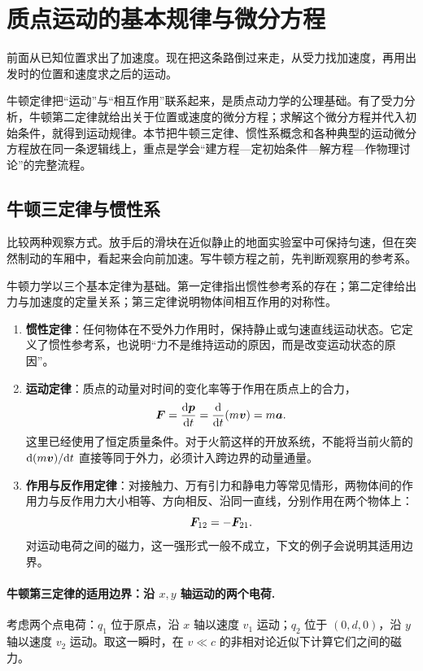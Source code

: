 \section{质点运动的基本规律与微分方程}

前面从已知位置求出了加速度。现在把这条路倒过来走，从受力找加速度，再用出发时的位置和速度求之后的运动。

牛顿定律把“运动”与“相互作用”联系起来，是质点动力学的公理基础。有了受力分析，牛顿第二定律就给出关于位置或速度的微分方程；求解这个微分方程并代入初始条件，就得到运动规律。本节把牛顿三定律、惯性系概念和各种典型的运动微分方程放在同一条逻辑线上，重点是学会“建方程—定初始条件—解方程—作物理讨论”的完整流程。

\subsection{牛顿三定律与惯性系}

比较两种观察方式。放手后的滑块在近似静止的地面实验室中可保持匀速，但在突然制动的车厢中，看起来会向前加速。写牛顿方程之前，先判断观察用的参考系。

牛顿力学以三个基本定律为基础。第一定律指出惯性参考系的存在；第二定律给出力与加速度的定量关系；第三定律说明物体间相互作用的对称性。

\begin{enumerate}[label=(\arabic*),leftmargin=2.2em]
  \item \textbf{惯性定律}：任何物体在不受外力作用时，保持静止或匀速直线运动状态。它定义了惯性参考系，也说明“力不是维持运动的原因，而是改变运动状态的原因”。
  \item \textbf{运动定律}：质点的动量对时间的变化率等于作用在质点上的合力，
  \begin{equation}
  \boldsymbol{F}=\frac{\mathrm{d} \boldsymbol{p}}{\mathrm{d} t}=\frac{\mathrm{d} }{\mathrm{d} t}(m\boldsymbol{v})=m\boldsymbol{a} .
  \label{eq:newton2}
  \end{equation}
  这里已经使用了恒定质量条件。对于火箭这样的开放系统，不能将当前火箭的 $\mathrm{d}(m\boldsymbol{v})/\mathrm{d} t$ 直接等同于外力，必须计入跨边界的动量通量。
  \item \textbf{作用与反作用定律}：对接触力、万有引力和静电力等常见情形，两物体间的作用力与反作用力大小相等、方向相反、沿同一直线，分别作用在两个物体上：
  \begin{equation}
  \boldsymbol{F}_{12}=-\boldsymbol{F}_{21}.
  \end{equation}
  对运动电荷之间的磁力，这一强形式一般不成立，下文的例子会说明其适用边界。
\end{enumerate}

\paragraph{牛顿第三定律的适用边界：沿 $x,y$ 轴运动的两个电荷.}
考虑两个点电荷：$q_1$ 位于原点，沿 $x$ 轴以速度 $v_1$ 运动；$q_2$ 位于 $(0,d,0)$，沿 $y$ 轴以速度 $v_2$ 运动。取这一瞬时，在 \(v\ll c\) 的非相对论近似下计算它们之间的磁力。

